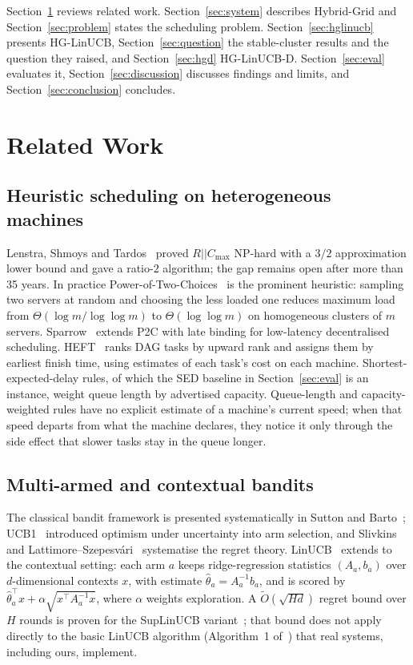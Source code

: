 \documentclass[final,5p,times,twocolumn]{elsarticle}
\begin{document}
Section~\ref{sec:related} reviews related work. Section~\ref{sec:system} describes Hybrid-Grid and Section~\ref{sec:problem} states the scheduling problem. Section~\ref{sec:hglinucb} presents HG-LinUCB, Section~\ref{sec:question} the stable-cluster results and the question they raised, and Section~\ref{sec:hgd} HG-LinUCB-D. Section~\ref{sec:eval} evaluates it, Section~\ref{sec:discussion} discusses findings and limits, and Section~\ref{sec:conclusion} concludes.

\section{Related Work}
\label{sec:related}

\subsection{Heuristic scheduling on heterogeneous machines}

Lenstra, Shmoys and Tardos~\cite{lenstra1990} proved $R||C_{\max}$ NP-hard with a $3/2$ approximation lower bound and gave a ratio-$2$ algorithm; the gap remains open after more than 35 years. In practice Power-of-Two-Choices~\cite{mitzenmacher2001} is the prominent heuristic: sampling two servers at random and choosing the less loaded one reduces maximum load from $\Theta(\log m/\log\log m)$ to $\Theta(\log\log m)$ on homogeneous clusters of $m$ servers. Sparrow~\cite{sparrow} extends P2C with late binding for low-latency decentralised scheduling. HEFT~\cite{heft} ranks DAG tasks by upward rank and assigns them by earliest finish time, using estimates of each task's cost on each machine. Shortest-expected-delay rules, of which the SED baseline in Section~\ref{sec:eval} is an instance, weight queue length by advertised capacity. Queue-length and capacity-weighted rules have no explicit estimate of a machine's current speed; when that speed departs from what the machine declares, they notice it only through the side effect that slower tasks stay in the queue longer.

\subsection{Multi-armed and contextual bandits}

The classical bandit framework is presented systematically in Sutton and Barto~\cite{sutton2018}; UCB1~\cite{auer2002} introduced optimism under uncertainty into arm selection, and Slivkins~\cite{slivkins2019} and Lattimore--Szepesv\'ari~\cite{lattimore2020} systematise the regret theory. LinUCB~\cite{li2010} extends to the contextual setting: each arm $a$ keeps ridge-regression statistics $(A_a,b_a)$ over $d$-dimensional contexts $x$, with estimate $\hat\theta_a=A_a^{-1}b_a$, and is scored by $\hat{\theta}_a^\top x+\alpha\sqrt{x^\top A_a^{-1}x}$, where $\alpha$ weights exploration. A $\tilde{O}(\sqrt{Hd})$ regret bound over $H$ rounds is proven for the SupLinUCB variant~\cite{chu2011}; that bound does not apply directly to the basic LinUCB algorithm (Algorithm~1 of~\cite{li2010}) that real systems, including ours, implement.
\end{document}
